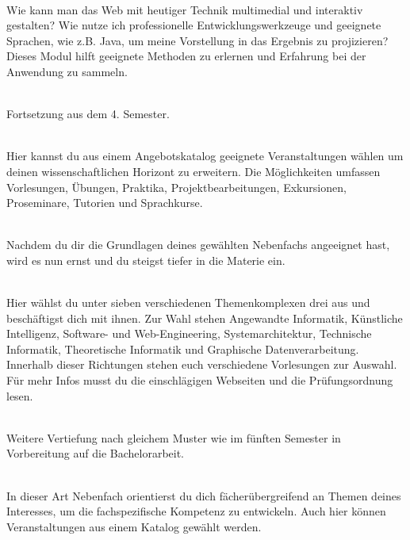 \textbf{} \\
Wie kann man das Web mit heutiger Technik multimedial und interaktiv gestalten?
Wie nutze ich professionelle Entwicklungswerkzeuge und geeignete Sprachen, wie z.B. Java, um meine Vorstellung in das Ergebnis zu projizieren?
Dieses Modul hilft geeignete Methoden zu erlernen und Erfahrung bei der Anwendung zu sammeln.

\textbf{} \\
Fortsetzung aus dem 4. Semester.

\textbf{} \\
Hier kannst du aus einem Angebotskatalog geeignete Veranstaltungen wählen um deinen wissenschaftlichen Horizont zu erweitern.
Die Möglichkeiten umfassen Vorlesungen, Übungen, Praktika, Projektbearbeitungen, Exkursionen, Proseminare, Tutorien und Sprachkurse.

\textbf{} \\
Nachdem du dir die Grundlagen deines gewählten Nebenfachs angeeignet hast, wird es nun ernst und du steigst tiefer in die Materie ein.

\textbf{} \\
Hier wählst du unter sieben verschiedenen Themenkomplexen drei aus und beschäftigst dich mit ihnen.
Zur Wahl stehen Angewandte Informatik, Künstliche Intelligenz, Software- und Web-Engineering, Systemarchitektur, Technische Informatik, Theoretische Informatik und Graphische Datenverarbeitung.
Innerhalb dieser Richtungen stehen euch verschiedene Vorlesungen zur Auswahl.
Für mehr Infos musst du die einschlägigen Webseiten und die Prüfungsordnung lesen.



\textbf{} \\
Weitere Vertiefung nach gleichem Muster wie im fünften Semester in Vorbereitung auf die Bachelorarbeit.

\textbf{} \\
In dieser Art Nebenfach orientierst du dich fächerübergreifend an Themen deines Interesses, um die fachspezifische Kompetenz zu entwickeln.
Auch hier können Veranstaltungen aus einem Katalog gewählt werden.

